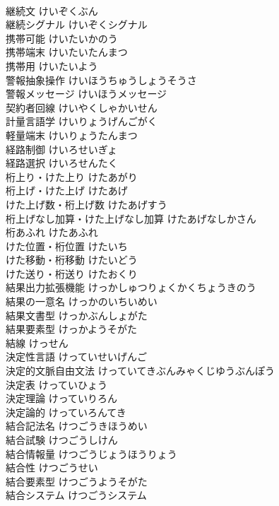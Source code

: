 \documentclass[8pt]{extreport}
\begin{document}
\begin{CJK}{UTF8}{min}
\\	継続文	けいぞくぶん	
\\	継続シグナル	けいぞくシグナル	
\\	携帯可能	けいたいかのう	
\\	携帯端末	けいたいたんまつ	
\\	携帯用	けいたいよう	
\\	警報抽象操作	けいほうちゅうしょうそうさ	
\\	警報メッセージ	けいほうメッセージ	
\\	契約者回線	けいやくしゃかいせん	
\\	計量言語学	けいりょうげんごがく	
\\	軽量端末	けいりょうたんまつ	
\\	経路制御	けいろせいぎょ	
\\	経路選択	けいろせんたく	
\\	桁上り・けた上り	けたあがり	
\\	桁上げ・けた上げ	けたあげ	
\\	けた上げ数・桁上げ数	けたあげすう	
\\	桁上げなし加算・けた上げなし加算	けたあげなしかさん	
\\	桁あふれ	けたあふれ	
\\	けた位置・桁位置	けたいち	
\\	けた移動・桁移動	けたいどう	
\\	けた送り・桁送り	けたおくり	
\\	結果出力拡張機能	けっかしゅつりょくかくちょうきのう	
\\	結果の一意名	けっかのいちいめい	
\\	結果文書型	けっかぶんしょがた	
\\	結果要素型	けっかようそがた	
\\	結線	けっせん	
\\	決定性言語	けっていせいげんご	
\\	決定的文脈自由文法	けっていてきぶんみゃくじゆうぶんぽう	
\\	決定表	けっていひょう	
\\	決定理論	けっていりろん	
\\	決定論的	けっていろんてき	
\\	結合記法名	けつごうきほうめい	
\\	結合試験	けつごうしけん	
\\	結合情報量	けつごうじょうほうりょう	
\\	結合性	けつごうせい	
\\	結合要素型	けつごうようそがた	
\\	結合システム	けつごうシステム	

\end{CJK}
\end{document}
